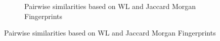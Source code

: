 \documentclass[
  super,
  preprint,
  3p]{elsarticle}
\begin{document}
\begin{figure}

\begin{minipage}{0.50\linewidth}

\begin{figure}[H]


\caption{\label{fig-timeline}Pairwise similarities based on WL and
Jaccard Morgan Fingerprints}

\end{figure}%

\end{minipage}%

\end{figure}%
\end{document}

